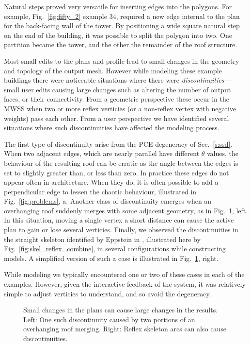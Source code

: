 Natural steps proved very versatile for inserting edges into the polygons. For example, Fig.~\ref{fig:fifty_2} example 34, required a new edge internal to the plan for the back-facing wall of the tower. By positioning a wide square natural step on the end of the building, it was possible to split the polygon into two. One partition became the tower, and the other the remainder of the roof structure.



Most small edits to the plans and profile lead to small changes in the geometry and topology of the output mesh. However while modeling these example buildings there were noticeable situations where there were \emph{discontinuities} --- small user edits causing large changes such as altering the number of output faces, or their connectivity. From a geometric perspective these occur in the MWSS when two or more reflex verticies (or a non-reflex vertex with negative weights) pass each other. From a user perspective we have identified several situations where such discontinuities have affected the modeling process. 


The first type of discontinuity arise from the PCE degeneracy of Sec.~\ref{s:ssd}. When two adjacent edges, which are nearly parallel have different $\theta$ values, the behaviour of the resulting roof can be erratic as the angle between the edges is set to slightly greater than, or less than zero. In practice these edges do not appear often in architecture. When they do, it is often possible to add a perpendicular edge to lessen the chaotic behaviour, illustrated in Fig.~\ref{fig:problems}, a. Another class of discontinuity emerges when an overhanging roof suddenly merges with some adjacent geometry, as in Fig.~\ref{fig:discontinuities}, left. In this situation, moving a single vertex a short distance can cause the active plan to gain or lose several verticies. Finally, we observed the discontinuities in the straight skeleton identified by Eppstein in \cite{Epp:98}, illustrated here by Fig.~\ref{fig:skel_reflex_combine}, in several configurations while constructing models. A simplified version of such a case is illustrated in Fig.~\ref{fig:discontinuities}, right. 

While modeling we typically encountered one or two of these cases in each of the examples. However, given the interactive feedback of the system, it was relatively simple to adjust verticies to understand, and so avoid the degeneracy.

\begin{figure}
  \centering
  \def\svgwidth{1.0\columnwidth}
  
  \caption[Discontinuities in the modeling space]{\label{fig:discontinuities}Small changes in the plans can cause large changes in the results. Left: One such discontinuity caused by two portions of an overhanging roof merging. Right: Reflex skeleton arcs can also cause discontinuities.}
\end{figure}





